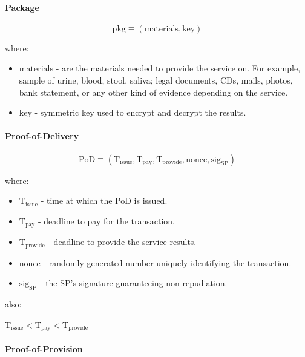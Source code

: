 \documentclass{ieeeaccess}
\begin{document}
\paragraph{Package}\label{package}

\[\mathrm{pkg} \equiv (\mathrm{materials}, \mathrm{key})\]

where:

\begin{itemize}

\item
  \(\mathrm{materials}\) - are the materials needed to provide the
  service on. For example, sample of urine, blood, stool, saliva; legal
  documents, CDs, mails, photos, bank statement, or any other kind of
  evidence depending on the service.
\item
  \(\mathrm{key}\) - symmetric key used to encrypt and decrypt the
  results.
\end{itemize}

\paragraph{Proof-of-Delivery}\label{proof-of-delivery}

\[\mathrm{PoD} \equiv (\mathrm{T}_\mathrm{issue}, \mathrm{T}_\mathrm{pay}, \mathrm{T}_\mathrm{provide}, \mathrm{nonce}, \mathrm{sig}_\mathrm{SP})\]

where:

\begin{itemize}

\item
  \(\mathrm{T}_\mathrm{issue}\) - time at which the PoD is issued.
\item
  \(\mathrm{T}_\mathrm{pay}\) - deadline to pay for the transaction.
\item
  \(\mathrm{T}_\mathrm{provide}\) - deadline to provide the service
  results.
\item
  \(\mathrm{nonce}\) - randomly generated number uniquely identifying
  the transaction.
\item
  \(\mathrm{sig}_\mathrm{SP}\) - the SP's signature guaranteeing
  non-repudiation.
\end{itemize}

also:

\(\mathrm{T}_\mathrm{issue} < \mathrm{T}_\mathrm{pay} < \mathrm{T}_\mathrm{provide}\)

\paragraph{Proof-of-Provision}\label{proof-of-provision}
\end{document}
